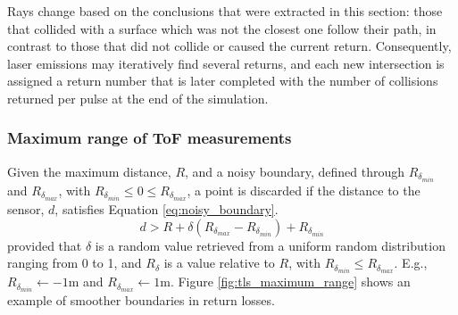 Rays change based on the conclusions that were extracted in this section: those that collided with a surface which was not the closest one follow their path, in contrast to those that did not collide or caused the current return. Consequently, laser emissions may iteratively find several returns, and each new intersection is assigned a return number that is later completed with the number of collisions returned per pulse at the end of the simulation. 
  

\subsubsection{Maximum range of ToF measurements}

Given the maximum distance, $R$, and a noisy boundary, defined through $R_{\delta_{\textit{min}}}$ and $R_{\delta_{\textit{max}}}$, with $R_{\delta_{\textit{min}}} \leq 0 \leq R_{\delta_{\textit{max}}}$, a point is discarded if the distance to the sensor, $d$, satisfies Equation \ref{eq:noisy_boundary}.
\begin{equation}
    \label{eq:noisy_boundary}
    d > R + \delta (R_{\delta_{\textit{max}}} - R_{\delta_{\textit{min}}}) + R_{\delta_{\textit{min}}}
\end{equation}
provided that $\delta$ is a random value retrieved from a uniform random distribution ranging from 0 to 1, and $R_{\delta}$ is a value relative to $R$, with $R_{\delta_{\textit{min}}} \leq R_{\delta_{\textit{max}}}$. E.g., $R_{\delta_{\textit{min}}} \gets -1 $\si{\meter} and $R_{\delta_{\textit{max}}} \gets 1 $\si{\meter}. Figure \ref{fig:tls_maximum_range} shows an example of smoother boundaries in return losses.

